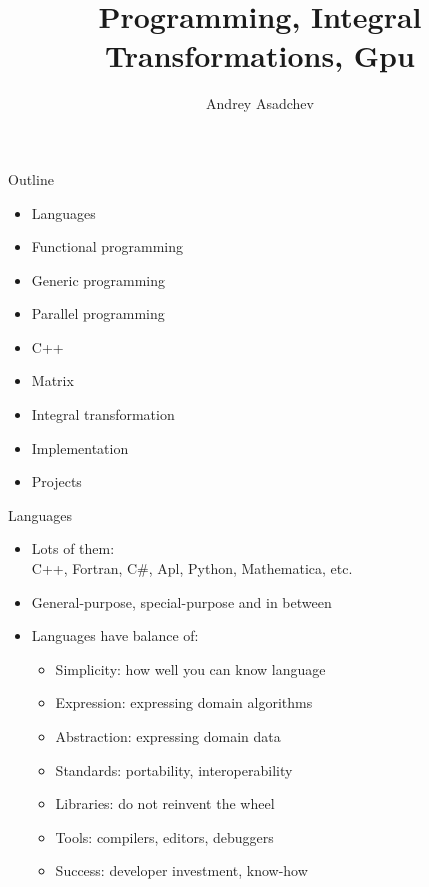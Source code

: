 \documentclass{beamer}
\title[ Programming, Integral Transformations, Gpu]{Programming, Integral Transformations, Gpu}
\author{ Andrey Asadchev}
\institute{Iowa State University}
\begin{document}
\begin{frame}
  \titlepage
\end{frame}


\begin{frame}{Outline}
  \begin{itemize}
  \item Languages
  \item Functional programming
  \item Generic programming
  \item Parallel programming
  \item C++
  \item Matrix
  \item Integral transformation
  \item Implementation
  \item Projects
  \end{itemize}
\end{frame}

\begin{frame}{Languages}
  \begin{itemize}
  \item Lots of them: \\
    C++, Fortran, C\#, Apl, Python, Mathematica, etc.
  \item General-purpose, special-purpose and in between
  \item Languages have balance of:
    \begin {itemize}
    \item Simplicity: how well you can know language
    \item Expression: expressing domain algorithms
    \item Abstraction: expressing domain data
    \item Standards: portability, interoperability
    \item Libraries: do not reinvent the wheel
    \item Tools: compilers, editors, debuggers
    \item Success: developer investment, know-how
    \end{itemize}
  \end{itemize}
\end{frame}
\end{document}
